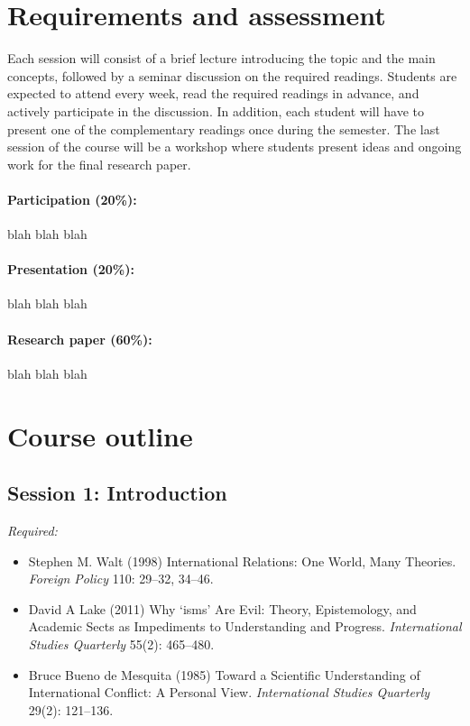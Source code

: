 \documentclass[12pt, a4paper]{article}
\begin{document}
\section{Requirements and assessment}

Each session will consist of a brief lecture introducing the topic and the main concepts, followed by a seminar discussion on the required readings. Students are expected to attend every week, read the required readings in advance, and actively participate in the discussion.
In addition, each student will have to present one of the complementary readings once during the semester.
The last session of the course will be a workshop where students present ideas and ongoing work for the final research paper.

\paragraph{Participation (20\%):}

blah blah blah

\paragraph{Presentation (20\%):}

blah blah blah

\paragraph{Research paper (60\%):}

blah blah blah

\section{Course outline}


\subsection*{Session 1: Introduction}

\noindent\textit{Required:}

\begin{itemize}
  \item Stephen M. Walt (1998) International Relations: One World, Many Theories. \textit{Foreign Policy} 110: 29--32, 34--46.
  \item David A Lake (2011) Why `isms' Are Evil: Theory, Epistemology, and Academic Sects as Impediments to Understanding and Progress. \textit{International Studies Quarterly} 55(2): 465--480.
  \item Bruce Bueno de Mesquita (1985) Toward a Scientific Understanding of International Conflict: A Personal View. \textit{International Studies Quarterly} 29(2): 121--136.
\end{itemize}
\end{document}
